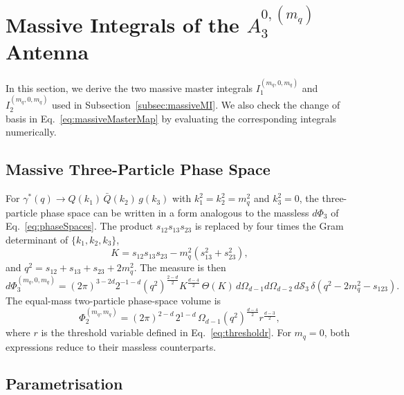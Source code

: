\section{Massive Integrals of the $A_3^{0,(m_q)}$ Antenna}\label{sec:MImassive}

In this section, we derive the two massive master integrals $I_1^{(m_q,0,m_q)}$ and
$I_2^{(m_q,0,m_q)}$ used in Subsection~\ref{subsec:massiveMI}. We also check the change of basis
in Eq.~\eqref{eq:massiveMasterMap} by evaluating the corresponding integrals numerically.

\subsection{Massive Three-Particle Phase Space}

For $\gamma^*(q)\to Q(k_1)\,\bar Q(k_2)\,g(k_3)$ with $k_1^2=k_2^2=m_q^2$ and $k_3^2=0$, the
three-particle phase space can be written in a form analogous to the massless $d\Phi_3$ of
Eq.~\eqref{eq:phaseSpaces}. The product $s_{12}s_{13}s_{23}$ is replaced by four times the Gram
determinant of $\{k_1,k_2,k_3\}$,
\begin{equation}
    K = s_{12}s_{13}s_{23}-m_q^2\left(s_{13}^2+s_{23}^2\right),
\end{equation}
and $q^2 = s_{12}+s_{13}+s_{23}+2m_q^2$. The measure is then
\begin{equation}
    d\Phi_3^{(m_q,0,m_q)} = (2\pi)^{3-2d}2^{-1-d}\!\left(q^2\right)^{\frac{2-d}{2}}K^{\frac{d-4}{2}}\,\Theta(K)\,
    d\Omega_{d-1}d\Omega_{d-2}\,d\mathcal S_3\,\delta\!\left(q^2-2m_q^2-s_{123}\right).
\end{equation}
The equal-mass two-particle phase-space volume is
\begin{equation}
    \Phi_2^{(m_q,m_q)} = (2\pi)^{2-d}\,2^{1-d}\,\Omega_{d-1}\left(q^2\right)^{\frac{d-4}{2}}r^{\frac{d-3}{2}},
\end{equation}
where $r$ is the threshold variable defined in Eq.~\eqref{eq:thresholdr}. For $m_q=0$, both
expressions reduce to their massless counterparts.

\subsection{Parametrisation}

